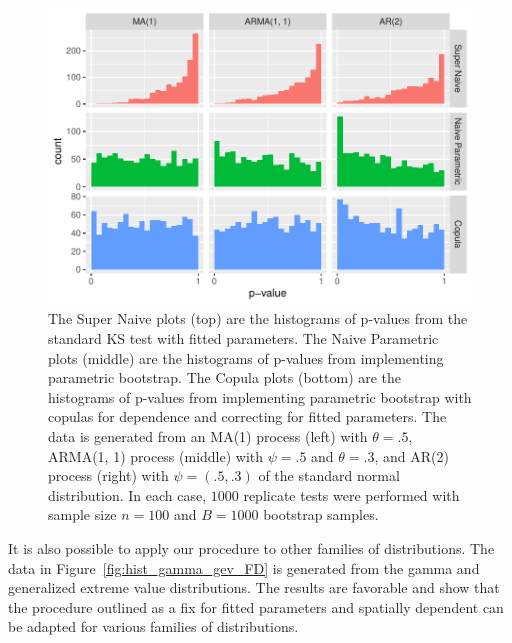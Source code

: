 \documentclass[12pt, letterpaper, titlepage]{article}
\begin{document}
\begin{figure}[tbp]
  \centering
  \includegraphics{hist_ma1_arma_ar2_FD}
  \caption{The Super Naive plots (top) are the histograms of p-values from the 
  standard KS test with fitted parameters. The Naive Parametric plots (middle) 
  are the histograms of p-values from implementing parametric bootstrap. The 
  Copula plots (bottom) are the histograms of p-values from implementing 
  parametric bootstrap with copulas for dependence and correcting for fitted 
  parameters. The data is generated from an MA(1) process (left) with 
  $\theta = .5$, ARMA(1, 1) process (middle) with $\psi = .5$ and $\theta = .3$,
  and AR(2) process (right) with $\psi = (.5, .3)$ of the standard normal 
  distribution. In each case, $1000$ replicate tests were performed with sample 
  size $n = 100$ and $B = 1000$ bootstrap samples.}
  \label{fig:hist_ma1_arma_ar2_FD}
\end{figure}

It is also possible to apply our procedure to other families of distributions. 
The data in Figure~\ref{fig:hist_gamma_gev_FD} is generated from the gamma and 
generalized extreme value distributions. The results are favorable and show that 
the procedure outlined as a fix for fitted parameters and spatially dependent 
can be adapted for various families of distributions.
\end{document}

